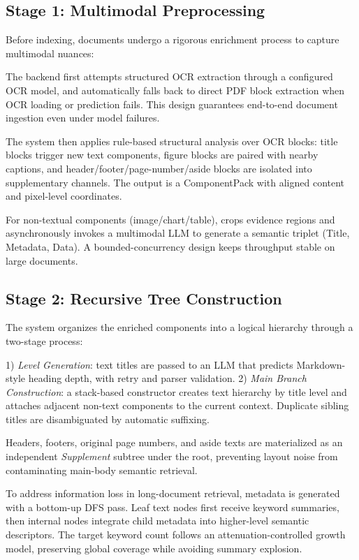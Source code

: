 \subsection{Stage 1: Multimodal Preprocessing}
Before indexing, documents undergo a rigorous enrichment process to capture multimodal nuances:

 The backend first attempts structured OCR extraction through a configured OCR model, and automatically falls back to direct PDF block extraction when OCR loading or prediction fails. This design guarantees end-to-end document ingestion even under model failures.

 The system then applies rule-based structural analysis over OCR blocks: title blocks trigger new text components, figure blocks are paired with nearby captions, and header/footer/page-number/aside blocks are isolated into supplementary channels. The output is a ComponentPack with aligned content and pixel-level coordinates.

 For non-textual components (image/chart/table), \modora crops evidence regions and asynchronously invokes a multimodal LLM to generate a semantic triplet (Title, Metadata, Data). A bounded-concurrency design keeps throughput stable on large documents.

\subsection{Stage 2: Recursive Tree Construction}
The system organizes the enriched components into a logical hierarchy through a two-stage process:

 1) \textit{Level Generation}: text titles are passed to an LLM that predicts Markdown-style heading depth, with retry and parser validation. 2) \textit{Main Branch Construction}: a stack-based constructor creates text hierarchy by title level and attaches adjacent non-text components to the current context. Duplicate sibling titles are disambiguated by automatic suffixing.

 Headers, footers, original page numbers, and aside texts are materialized as an independent \textit{Supplement} subtree under the root, preventing layout noise from contaminating main-body semantic retrieval.

\begin{sloppypar}
 To address information loss in long-document retrieval, metadata is generated with a bottom-up DFS pass. Leaf text nodes first receive keyword summaries, then internal nodes integrate child metadata into higher-level semantic descriptors. The target keyword count follows an attenuation-controlled growth model, preserving global coverage while avoiding summary explosion.
\end{sloppypar}

